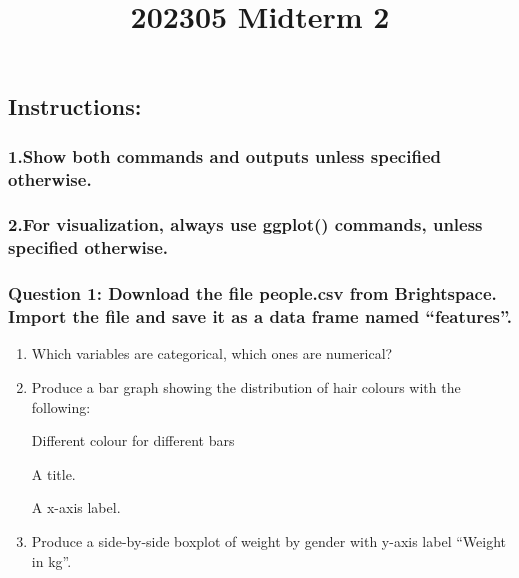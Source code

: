 \documentclass[
]{article}
\title{202305 Midterm 2}
\author{}
\date{\vspace{-2.5em}}
\begin{document}
\maketitle

\hypertarget{instructions}{%
\subsection{Instructions:}\label{instructions}}

\hypertarget{show-both-commands-and-outputs-unless-specified-otherwise.}{%
\subsubsection{1.Show both commands and outputs unless specified
otherwise.}\label{show-both-commands-and-outputs-unless-specified-otherwise.}}

\hypertarget{for-visualization-always-use-ggplot-commands-unless-specified-otherwise.}{%
\subsubsection{2.For visualization, always use ggplot() commands, unless
specified
otherwise.}\label{for-visualization-always-use-ggplot-commands-unless-specified-otherwise.}}

\hypertarget{question-1-download-the-file-people.csv-from-brightspace.-import-the-file-and-save-it-as-a-data-frame-named-features.}{%
\subsubsection{Question 1: Download the file people.csv from
Brightspace. Import the file and save it as a data frame named
``features''.}\label{question-1-download-the-file-people.csv-from-brightspace.-import-the-file-and-save-it-as-a-data-frame-named-features.}}

\begin{enumerate}
\def\labelenumi{\alph{enumi}.}
\item
  Which variables are categorical, which ones are numerical?
\item
  Produce a bar graph showing the distribution of hair colours with the
  following:

  Different colour for different bars

  A title.

  A x-axis label.
\item
  Produce a side-by-side boxplot of weight by gender with y-axis label
  ``Weight in kg''.
\end{enumerate}
\end{document}
